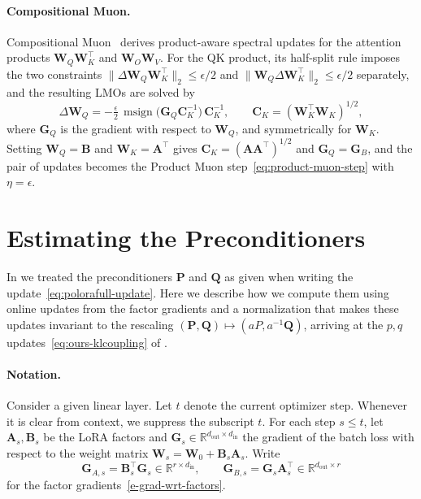 \documentclass[11pt]{article}
\newcommand{\mat}[1]{\bm{#1}}
\newcommand{\R}{\mathbb{R}}
\DeclareMathOperator{\msign}{msign}          %
\newcommand{\norm}[1]{\| #1\|}
\begin{document}
\paragraph{Compositional Muon.}
Compositional Muon~\cite{tilde_csd} derives product-aware spectral updates for the attention products $\mat{W}_Q\mat{W}_K^\top$ and $\mat{W}_O\mat{W}_V$. For the QK product, its half-split rule imposes the two constraints $\norm{\Delta\mat{W}_Q \mat{W}_K^\top}_2\le\epsilon/2$ and $\norm{\mat{W}_Q\Delta\mat{W}_K^\top}_2\le\epsilon/2$ separately, and the resulting LMOs are solved by
\[
  \Delta\mat{W}_Q=-\tfrac{\epsilon}{2}\,\msign\!\big(\mat{G}_Q \mat{C}_K^{-1}\big)\,\mat{C}_K^{-1},
  \qquad \mat{C}_K=(\mat{W}_K^\top \mat{W}_K)^{1/2},
\]
where $\mat{G}_Q$ is the gradient with respect to $\mat{W}_Q$, and symmetrically for $\mat{W}_K$. Setting $\mat{W}_Q=\mat{B}$ and $\mat{W}_K=\mat{A}^\top$ gives $\mat{C}_K=(\mat{A}\mat{A}^\top)^{1/2}$ and $\mat{G}_Q=\mat{G}_B$, and the pair of updates becomes the Product Muon step~\eqref{eq:product-muon-step} with $\eta=\epsilon$.



\section{Estimating the Preconditioners}
\label{app:matnormal}
In  we treated the preconditioners $\mat{P}$ and $\mat{Q}$ as given when writing the update~\eqref{eq:polorafull-update}. Here we describe how we compute them using online updates from the factor gradients and a normalization that makes these updates invariant to the rescaling $(\mat{P},\mat{Q})\mapsto(aP,a^{-1}\mat{Q})$, arriving at the $p,q$ updates~\eqref{eq:ours-klcoupling} of .

\paragraph{Notation.} Consider a given linear layer. Let $t$ denote the current optimizer step. Whenever it is clear from context, we suppress the subscript $t$. For each step $s\le t$,
let $\mat{A}_s,\mat{B}_s$ be the LoRA factors and
$\mat{G}_s\in\R^{d_{\mathrm{out}}\times d_{\mathrm{in}}}$ the gradient of the batch loss with respect to the weight matrix $\mat{W}_s=\mat{W}_0+\mat{B}_s\mat{A}_s$. Write
\begin{equation} \label{eq:chain-rule}
  \mat{G}_{A,s}=\mat{B}_s^\top \mat{G}_s\in\R^{r\times d_{\mathrm{in}}},\qquad
  \mat{G}_{B,s}=\mat{G}_s\mat{A}_s^\top\in\R^{d_{\mathrm{out}}\times r}
\end{equation}
for the factor
gradients~\eqref{e-grad-wrt-factors}.
\end{document}
